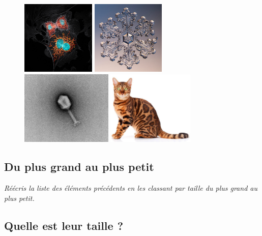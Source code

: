 \documentclass[12pt,a4paper]{article}
\begin{document}
\begin{figure}[h]
\includegraphics[height=100pt]{images/bpae_cell_mitosis.jpg}
\hfill
\includegraphics[height=100pt]{images/flocon_neige.jpg}
\hfill
\includegraphics[height=100pt]{images/virus.jpg}
\hfill
\includegraphics[height=100pt]{images/chat_bengal.jpg}
\end{figure}

\vspace{20pt}


\subsection{Du plus grand au plus petit}

\emph{Réécris la liste des éléments précédents en les classant par taille du plus grand au plus petit.}

\newpage

\subsection{Quelle est leur taille ?}
\end{document}
